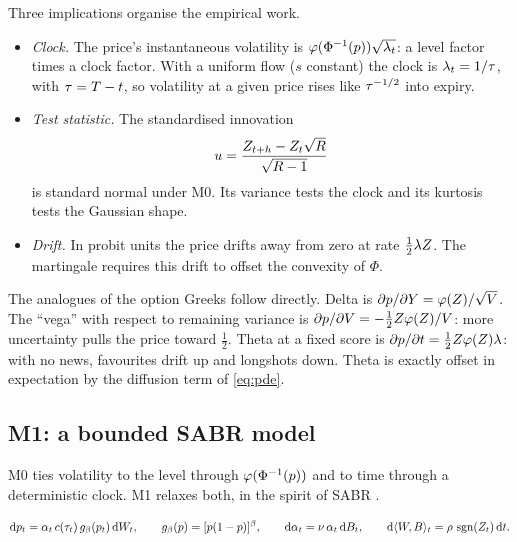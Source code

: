 Three implications organise the empirical work.
\begin{itemize}
  \item \emph{Clock.} The price's instantaneous volatility is $\varphi(\Phi^{-1}(p))\sqrt{\lambda_t}$:
  a level factor times a clock factor. With a uniform flow ($s$ constant) the clock is
  $\lambda_t=1/\tau$, with $\tau=T-t$, so volatility at a given price rises like
  $\tau^{-1/2}$ into expiry.
  \item \emph{Test statistic.} The standardised innovation
  \begin{equation}\label{eq:u}
    u=\frac{Z_{t+h}-Z_t\sqrt R}{\sqrt{R-1}}
  \end{equation}
  is standard normal under M0. Its variance tests the clock and its kurtosis tests the Gaussian
  shape.
  \item \emph{Drift.} In probit units the price drifts away from zero at rate $\tfrac12\lambda Z$. The
  martingale requires this drift to offset the convexity of $\Phi$.
\end{itemize}

The analogues of the option Greeks follow directly. Delta is $\partial p/\partial Y=\varphi(Z)/\sqrt{V}$.
The ``vega'' with respect to remaining variance is $\partial p/\partial V=-\tfrac12Z\varphi(Z)/V$:
more uncertainty pulls the price toward $\tfrac12$. Theta at a fixed score is
$\partial p/\partial t=\tfrac12Z\varphi(Z)\lambda$: with no news, favourites drift up and
longshots down. Theta is exactly offset in expectation by the diffusion term of \eqref{eq:pde}.

\subsection{M1: a bounded SABR model}\label{sec:model-m1}

M0 ties volatility to the level through $\varphi(\Phi^{-1}(p))$ and to time through a
deterministic clock. M1 relaxes both, in the spirit of SABR \citep{hagan2002}.

\begin{definition}[M1]\label{def:m1}
\begin{equation}\label{eq:m1}
  \mathrm{d}p_t=\alpha_t\,c(\tau_t)\,g_\beta(p_t)\,\mathrm{d} W_t,\qquad
  g_\beta(p)=[p(1-p)]^\beta,\qquad
  \mathrm{d}\alpha_t=\nu\,\alpha_t\,\mathrm{d} B_t,\qquad
  \mathrm{d}\langle W,B\rangle_t=\rho\,\operatorname{sgn}(Z_t)\,\mathrm{d} t .
\end{equation}
\end{definition}

